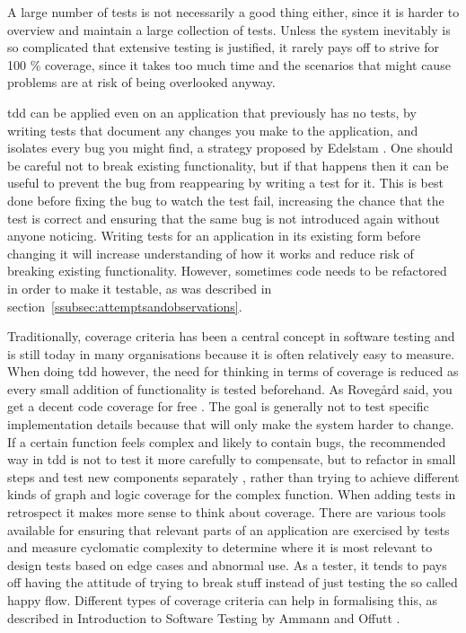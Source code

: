 \documentclass[11pt]{article}
\begin{document}
A large number of tests is not necessarily a good thing either, since it is harder to overview and maintain a large collection of tests. Unless the system inevitably is so complicated that extensive testing is justified, it rarely pays off to strive for 100 \% coverage, since it takes too much time and the scenarios that might cause problems are at risk of being overlooked anyway. \cite[question~28]{Edelstam}

\Gls{tdd} can be applied even on an application that previously has no tests, by writing tests that document any changes you make to the application, and isolates every bug you might find, a strategy proposed by Edelstam \cite[question~30]{Edelstam}. One should be careful not to break existing functionality, but if that happens then it can be useful to prevent the bug from reappearing by writing a test for it. This is best done before fixing the bug to watch the test fail, increasing the chance that the test is correct and ensuring that the same bug is not introduced again without anyone noticing. Writing tests for an application in its existing form before changing it will increase understanding of how it works and reduce risk of breaking existing functionality. However, sometimes code needs to be refactored in order to make it testable, as was described in section~\ref{ssubsec:attemptsandobservations}.

Traditionally, coverage criteria has been a central concept in software testing and is still today in many organisations because it is often relatively easy to measure. When doing \gls{tdd} however, the need for thinking in terms of coverage is reduced as every small addition of functionality is tested beforehand. As Rovegård said, you get a decent code coverage for free \cite[question~34]{Rovegard}. The goal is generally not to test specific implementation details because that will only make the system harder to change. If a certain function feels complex and likely to contain bugs, the recommended way in \gls{tdd} is not to test it more carefully to compensate, but to refactor in small steps and test new components separately \cite[question~34]{Stenmark}, rather than trying to achieve different kinds of graph and logic coverage for the complex function. When adding tests in retrospect it makes more sense to think about coverage. There are various tools available for ensuring that relevant parts of an application are exercised by tests and measure cyclomatic complexity to determine where it is most relevant to design tests based on edge cases and abnormal use. As a tester, it tends to pays off having the attitude of trying to break stuff instead of just testing the so called happy flow. Different types of coverage criteria can help in formalising this, as described in Introduction to Software Testing by Ammann and Offutt \cite{AmmannOffutt}.
\end{document}
